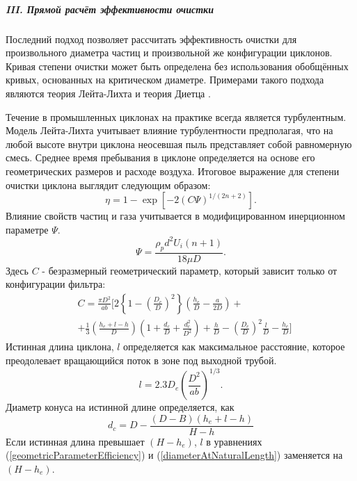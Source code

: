 			\subparagraph{III. Прямой расчёт эффективности очистки\\}

			Последний подход позволяет рассчитать эффективность очистки для произвольного диаметра частиц и произвольной же конфигурации циклонов. Кривая степени очистки может быть определена без использования обобщённых кривых, основанных на критическом диаметре. Примерами такого подхода являются теория Лейта-Лихта \cite{LeithLicht} и теория Диетца \cite{Dietz}.
			
			Течение в промышленных циклонах на практике всегда является турбулентным. Модель Лейта-Лихта учитывает влияние турбулентности предполагая, что на любой высоте внутри циклона неосевшая пыль представляет собой равномерную смесь. Среднее время пребывания в циклоне определяется на основе его геометрических размеров и расходе воздуха. Итоговое выражение для степени очистки циклона выглядит следующим образом:
			\begin{equation}
				\eta = 1 - \exp[-2 (C\Psi)^{1/(2n+2)}].
			\end{equation}
			Влияние свойств частиц и газа учитывается в модифицированном инерционном параметре $\Psi$.
			\begin{equation}
				\Psi = \frac{\rho_p d^2 U_i (n+1)}{18 \mu D}.
			\end{equation}
			Здесь $C$ - безразмерный геометрический параметр, который зависит только от конфигурации фильтра:
			\begin{equation}
				\begin{aligned}
					\label{geometricParameterEfficiency}
					&C = \frac{\pi D^2}{ab} \Bigg[ 2 \left\lbrace 1 - \left( \frac{D_e}{D}\right)^2 \right\rbrace\left( \frac{h_e}{D} - \frac{a}{2D} \right) + \\ &+ \frac{1}{3} \left( \frac{h_e + l - h}{D} \right)\left( 1+\frac{d_c}{D} + \frac{d_c^2}{D^2}  \right) + \frac{h}{D} - \left( \frac{D_e}{D} \right)^2\frac{l}{D} - \frac{h_e}{D}\Bigg]			
				\end{aligned}
			\end{equation}
			Истинная длина циклона, $l$ определяется как максимальное расстояние, которое преодолевает вращающийся поток в зоне под выходной трубой. 
			\begin{equation}
				\label{naturalLength}
				l = 2.3D_e\left(\frac{D^2}{ab}\right)^{1/3}.
			\end{equation}
			Диаметр конуса на истинной длине определяется, как
			\begin{equation}
			\label{diameterAtNaturalLength}
				d_c = D - \frac{(D-B)(h_e + l -h)}{H - h}
			\end{equation}
			Если истинная длина превышает $(H-h_e)$, $l$ в уравнениях (\ref{geometricParameterEfficiency}) и (\ref{diameterAtNaturalLength}) заменяется на $(H - h_e)$.
			

